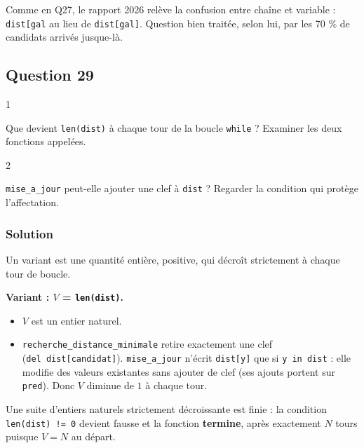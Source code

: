 \documentclass[11pt,a4paper]{article}
\providecommand{\tightlist}{\setlength{\itemsep}{0pt}\setlength{\parskip}{0pt}}
\begin{document}
\begin{piege}

Comme en Q27, le rapport 2026 relève la confusion entre chaîne et variable : \texttt{dist{[}\textquotesingle{}gal\textquotesingle{}{]}} au lieu de \texttt{dist{[}gal{]}}. Question bien traitée, selon lui, par les 70 \% de candidats arrivés jusque-là.

\end{piege}

\hypertarget{question-29}{%
\subsection{Question 29}\label{question-29}}

\begin{indication}{1}

Que devient \texttt{len(dist)} à chaque tour de la boucle \texttt{while} ? Examiner les deux fonctions appelées.

\end{indication}

\begin{indication}{2}

\texttt{mise\_a\_jour} peut-elle ajouter une clef à \texttt{dist} ? Regarder la condition qui protège l'affectation.

\end{indication}

\hypertarget{solution-28}{%
\subsubsection{Solution}\label{solution-28}}

Un variant est une quantité entière, positive, qui décroît strictement à chaque tour de boucle.

\textbf{Variant : \(V\) = \texttt{len(dist)}.}

\begin{itemize}
\tightlist
\item
  \(V\) est un entier naturel.
\item
  \texttt{recherche\_distance\_minimale} retire exactement une clef (\texttt{del\ dist{[}candidat{]}\allowbreak{}}). \texttt{mise\_a\_jour} n'écrit \texttt{dist{[}y{]}} que si \texttt{y\ in\ dist} : elle modifie des valeurs existantes sans ajouter de clef (ses ajouts portent sur \texttt{pred}). Donc \(V\) diminue de \(1\) à chaque tour.
\end{itemize}

Une suite d'entiers naturels strictement décroissante est finie : la condition \texttt{len(dist)\ !=\ 0} devient fausse et la fonction \textbf{termine}, après exactement \(N\) tours puisque \(V = N\) au départ.
\end{document}
